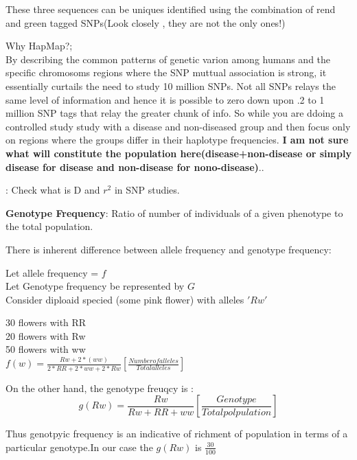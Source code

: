 \documentclass[a4paper]{article}
\begin{document}
These three sequences can be uniques identified using the combination of rend and green tagged SNPs(Look closely , they are not the only ones!)

Why HapMap?;\\
By describing the common patterns of genetic varion among humans and the specific chromosoms regions where the SNP muttual association is strong, it essentially curtails the need to study 10 million SNPs. Not all SNPs relays the same level of information and hence it is possible to zero down upon .2 to 1 million SNP tags that relay the greater chunk of info. So while you are ddoing a controlled study study with a disease and non-diseased group  and then focus only on regions where the groups differ in their haplotype frequencies. 
\textbf{I am not sure what will constitute the population here(disease+non-disease or simply disease for disease and non-disease for nono-disease)}..

\color{red}{TODO}: Check what is D and $r^2$ in SNP studies.

\textbf{Genotype Frequency}: Ratio of number of individuals of a given phenotype to the total population.

There is inherent difference between allele frequency and genotype frequency:

Let  allele frequency = $f$ \\
Let Genotype frequency be represented by $G$ \\

Consider diploaid specied (some pink flower) with alleles $'Rw'$

30 flowers with RR\\
20 flowers with Rw\\
50 flowers with ww\\

\begin{math}
f(w) = \frac{Rw+2*(ww)}{2*RR+2*ww+2*Rw} [\frac{Number of  alleles}{Total alleles}]
\end{math}

On the other hand, the genotype freuqcy is :\\
\begin{equation}
g(Rw)=\frac{Rw}{Rw+RR+ww}[\frac{Genotype}{Total polpulation}]
\end{equation}

Thus genotpyic frequency is an indicative of richment of population in terms of a particular genotype.In our case
the $g(Rw)$ is $\frac{30}{100}$
\end{document}
